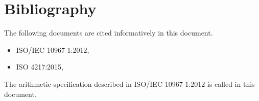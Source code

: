 
\chapter{Bibliography}

The following documents are cited informatively in this document.

\begin{itemize}
\renewcommand{\labelitemi}{---}
\item
  ISO/IEC 10967-1:2012,
\item
  ISO 4217:2015,
\end{itemize}

The arithmetic specification described in ISO/IEC 10967-1:2012 is
called  in this document.

\let\realglossitem\glossitem
\renewcommand{\glossitem}[4]{\hangpara{4em}{1}\realglossitem{#1}{#2}{#3}{#4}}

\clearpage
\renewcommand{\glossaryname}{Cross references}
\renewcommand{\preglossaryhook}{This annex lists each section label and the
corresponding section number and page number, in alphabetical order by label.\\}
\twocolglossary
\renewcommand{\leftmark}{\glossaryname}
{
\raggedright
\printglossary[xrefindex]
}

\clearpage

\renewcommand{\glossaryname}{Cross references from ISO \CppXVII}
\renewcommand{\preglossaryhook}{All section labels from
ISO \CppXVII (ISO/IEC 14882:2017, \doccite{Programming Languages --- \Cpp})
are present in this document, with the exceptions described below.\\}
\renewcommand{\leftmark}{\glossaryname}
{
\raggedright
\printglossary[xrefdelta]
}

\clearpage
\renewcommand{\leftmark}{\indexname}
{
\raggedright
\printindex[generalindex]
}

\clearpage
\renewcommand{\indexname}{Index of grammar productions}
\renewcommand{\preindexhook}{The first page number for each entry is the page in the
general text where the grammar production is defined. The second page number is the
corresponding page in the Grammar summary\iref{gram}.\\}
\renewcommand{\leftmark}{\indexname}
{
\raggedright
\printindex[grammarindex]
}

\clearpage
\renewcommand{\preindexhook}{}
\renewcommand{\indexname}{Index of library names}
\renewcommand{\leftmark}{\indexname}
{
\raggedright
\printindex[libraryindex]
}

\clearpage
\renewcommand{\preindexhook}{The entries in this section are rough descriptions; exact
specifications are at the indicated page in the general text.\\}
\renewcommand{\indexname}{Index of implementation-defined behavior}
\renewcommand{\leftmark}{\indexname}
{
\raggedright
\printindex[impldefindex]
}
